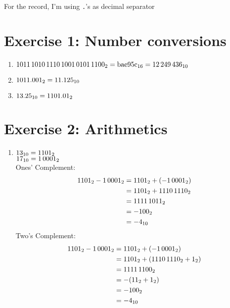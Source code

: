 \documentclass{gadsescript}
\begin{document}
\maketitle

For the record, I'm using \verb|.|'s as decimal separator
\section*{Exercise 1: Number conversions}
\begin{enumerate}[label=\alph*)]
	\item $ \binnum{1011 1010 1110 1001 0101 1100} = \hexnum{bae95c} = \decnum{12249436} $
	\item $ \binnum{1011.001} = \decnum{11.125} $
	\item $ \decnum{13.25} = \binnum{1101.01} $
\end{enumerate}

\section*{Exercise 2: Arithmetics}
\begin{enumerate}[label=\alph*)]
	\item $\decnum{13} = \binnum{00001101}$\\
		$ \decnum{17} = \binnum{00010001} $\\
		Ones' Complement:\\
		\begin{align*}
			\binnum{00001101} - \binnum{00010001} &= \binnum{00001101} + (-\binnum{00010001})\\
			~&= \binnum{00001101} + \binnum{11101110}\\
			~&= \binnum{11111011}\\
			~&= -\binnum{00000100}\\
			~&= -\decnum{4}
		\end{align*}
		Two's Complement:\\
		\begin{align*}
			\binnum[8]{00001101} - \binnum[8]{00010001} &= \binnum[8]{00001101} + (-\binnum[8]{00010001})\\
			~&= \binnum[8]{00001101} + (\binnum{11101110} + \binnum{1} )\\
			~&= \binnum{11111100}\\
			~&= -(\binnum[8]{00000011} + \binnum{1})\\
			~&= -\binnum[8]{100}\\
			~&= -\decnum{4}
		\end{align*}
\end{enumerate}
\end{document}
